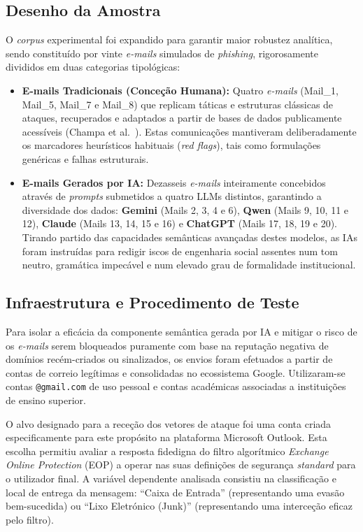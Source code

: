 \documentclass[pdflatex,sn-mathphys-num]{sn-jnl}
\theoremstyle{thmstyleone}%
\theoremstyle{thmstyletwo}%
\theoremstyle{thmstylethree}%
\begin{document}
\subsection{Desenho da Amostra}
O \textit{corpus} experimental foi expandido para garantir maior robustez analítica, sendo constituído por vinte \textit{e-mails} simulados de \textit{phishing}, rigorosamente divididos em duas categorias tipológicas:
\begin{itemize}
    \item \textbf{E-mails Tradicionais (Conceção Humana):} Quatro \textit{e-mails} (Mail\_1, Mail\_5, Mail\_7 e Mail\_8) que replicam táticas e estruturas clássicas de ataques, recuperados e adaptados a partir de bases de dados publicamente acessíveis (Champa et al.~\cite{bib12}). Estas comunicações mantiveram deliberadamente os marcadores heurísticos habituais (\textit{red flags}), tais como formulações genéricas e falhas estruturais.
    \item \textbf{E-mails Gerados por IA:} Dezasseis \textit{e-mails} inteiramente concebidos através de \textit{prompts} submetidos a quatro LLMs distintos, garantindo a diversidade dos dados: \textbf{Gemini} (Mails 2, 3, 4 e 6), \textbf{Qwen} (Mails 9, 10, 11 e 12), \textbf{Claude} (Mails 13, 14, 15 e 16) e \textbf{ChatGPT} (Mails 17, 18, 19 e 20). Tirando partido das capacidades semânticas avançadas destes modelos, as IAs foram instruídas para redigir iscos de engenharia social assentes num tom neutro, gramática impecável e num elevado grau de formalidade institucional.
\end{itemize}

\subsection{Infraestrutura e Procedimento de Teste}\label{sec3.2}
Para isolar a eficácia da componente semântica gerada por IA e mitigar o risco de os \textit{e-mails} serem bloqueados puramente com base na reputação negativa de domínios recém-criados ou sinalizados, os envios foram efetuados a partir de contas de correio legítimas e consolidadas no ecossistema Google. Utilizaram-se contas \texttt{@gmail.com} de uso pessoal e contas académicas associadas a instituições de ensino superior. 

O alvo designado para a receção dos vetores de ataque foi uma conta criada especificamente para este propósito na plataforma Microsoft Outlook. Esta escolha permitiu avaliar a resposta fidedigna do filtro algorítmico \textit{Exchange Online Protection} (EOP) a operar nas suas definições de segurança \textit{standard} para o utilizador final. A variável dependente analisada consistiu na classificação e local de entrega da mensagem: ``Caixa de Entrada'' (representando uma evasão bem-sucedida) ou ``Lixo Eletrónico (Junk)'' (representando uma interceção eficaz pelo filtro).
\end{document}
